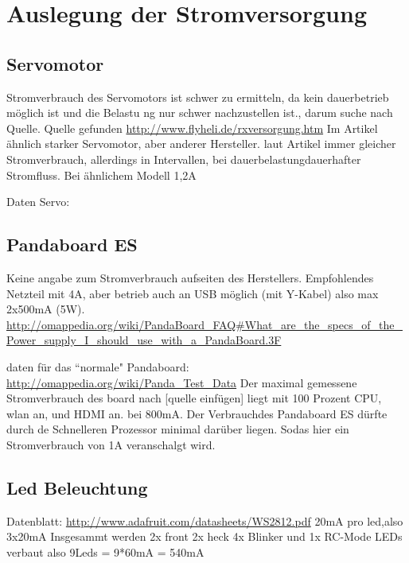 \chapter{Auslegung der Stromversorgung}

\section{Servomotor}
Stromverbrauch des Servomotors ist schwer zu ermitteln, da kein dauerbetrieb möglich ist und die Belastu ng nur schwer nachzustellen ist.,
darum suche nach Quelle. Quelle gefunden \cite{website-servo}
\url{http://www.flyheli.de/rxversorgung.htm}
Im Artikel ähnlich starker Servomotor, aber anderer Hersteller.
laut Artikel immer gleicher Stromverbrauch, allerdings in Intervallen, bei dauerbelastungdauerhafter Stromfluss.
Bei ähnlichem Modell 1,2A



Daten Servo:





\section{Pandaboard ES}

Keine angabe zum Stromverbrauch aufseiten des Herstellers.
Empfohlendes Netzteil mit 4A, aber betrieb auch an USB möglich (mit Y-Kabel) also max 2x500mA (5W).
\url{http://omappedia.org/wiki/PandaBoard_FAQ#What_are_the_specs_of_the_Power_supply_I_should_use_with_a_PandaBoard.3F} \cite{website-panda-supply}

daten für das ``normale" Pandaboard:
\url{http://omappedia.org/wiki/Panda_Test_Data} \cite{website-panda-power}
Der maximal gemessene Stromverbrauch des board nach [quelle einfügen] liegt mit 100 Prozent CPU, wlan an, und HDMI an. bei 800mA.
Der Verbrauchdes Pandaboard ES dürfte durch de Schnelleren Prozessor minimal darüber liegen. Sodas hier ein Stromverbrauch von 1A veranschalgt wird.

\section{Led Beleuchtung}
Datenblatt:
\url{http://www.adafruit.com/datasheets/WS2812.pdf} \cite{ds-WS2812}
20mA pro led,also 3x20mA
Insgesammt werden 2x front 2x heck 4x Blinker und 1x RC-Mode LEDs verbaut also 9Leds = 9*60mA = 540mA

